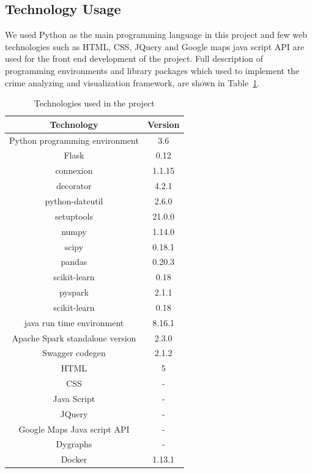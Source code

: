 \subsection{Technology Usage}
We used Python as the main programming language in this project and
few web technologies such as HTML, CSS, JQuery and Google maps java
script API are used for the front end development of the project. Full
description of programming environments and library packages which
used to implement the crime analyzing and visualization framework, are
shown in Table~\ref{tab:technology}.
\begin{table}[]
\centering
\caption{Technologies used in the project}\label{tab:technology}
\begin{tabular}{*{2}{c}}
\toprule
Technology                      & Version \\
\midrule
Python programming environment  & 3.6     \\
Flask                           & 0.12    \\
connexion                       & 1.1.15  \\
decorator                       & 4.2.1   \\
python-dateutil                 & 2.6.0   \\
setuptools                      & 21.0.0  \\
numpy                           & 1.14.0  \\
scipy                           & 0.18.1  \\
pandas                          & 0.20.3  \\
scikit-learn                    & 0.18    \\
pyspark                         & 2.1.1   \\
scikit-learn                    & 0.18    \\
java run time environment       & 8.16.1  \\
Apache Spark standalone version & 2.3.0   \\
Swagger codegen                 & 2.1.2   \\
HTML                            & 5       \\
CSS                             & -       \\
Java Script                     & -       \\
JQuery                          & -       \\
Google Maps Java script API     & -       \\
Dygraphs                        & -       \\
Docker                          & 1.13.1  \\
\bottomrule
\end{tabular}
\end{table}

